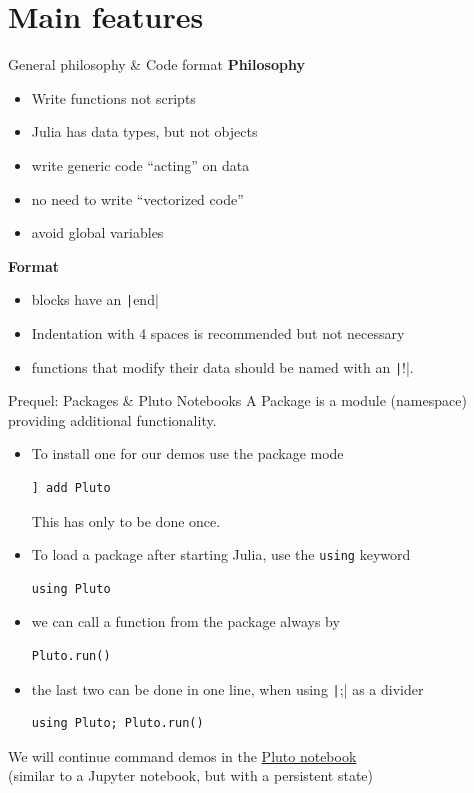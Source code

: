 \documentclass[aspectratio=169, 12pt]{beamer}
\begin{document}
    \section{Main features}
    \begin{frame}{General philosophy \& Code format}
        \alert{\textbf{Philosophy}}
        \begin{itemize}
            \item Write functions not scripts
            \item Julia has data types, but not objects
            \item write generic code “acting” on data
            \item no need to write “vectorized code”
            \item avoid global variables
        \end{itemize}
        \vspace{\baselineskip}
        \pause
        \alert{\textbf{Format}}
        \begin{itemize}
            \item blocks have an \texttt|end|
            \item Indentation with 4 spaces is recommended but not necessary
            \item functions that modify their data should be named with an \texttt|!|.
        \end{itemize}
    \end{frame}
    \begin{frame}[fragile]{Prequel: Packages \& Pluto Notebooks}
        A \alert{Package} is a \alert{module} (namespace) providing additional functionality.

        \begin{itemize}[<+->]
            \item To install one for our demos use the package mode
            \begin{verbatim}
] add Pluto
            \end{verbatim}
            This has only to be done once.
            \item To load a package after starting Julia,
            use the \texttt{using} keyword
            \begin{verbatim}
using Pluto
            \end{verbatim}
            \item we can call a function from the package always by
            \begin{verbatim}
Pluto.run()
            \end{verbatim}
            \item the last two can be done in one line, when using \texttt|;| as a divider
            \begin{verbatim}
using Pluto; Pluto.run()
            \end{verbatim}
        \end{itemize}
        \pause
        We will continue command demos in the \href{https://plutojl.org}{Pluto notebook}
        \\\hfill (similar to a Jupyter notebook, but with a persistent state)
    \end{frame}
\end{document}
